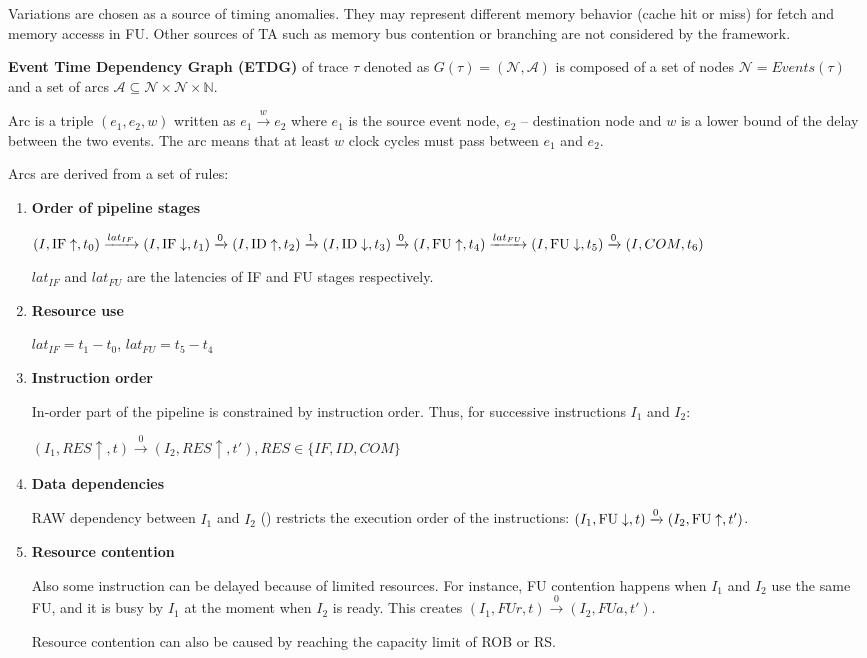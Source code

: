 Variations are chosen as a source of timing anomalies. They may represent different memory behavior (cache hit or miss) for fetch and memory accesss in FU. Other sources of TA such as memory bus contention or branching are not considered by the framework.

\textbf{Event Time Dependency Graph (ETDG)} of trace $\tau$ denoted as $G(\tau) = (\mathcal{N}, \mathcal{A})$ is composed of a set of nodes $\mathcal{N} = Events(\tau)$ and a set of arcs $\mathcal{A} \subseteq \mathcal{N} \times \mathcal{N} \times \mathbb{N}$. 


Arc is a triple $(e_1, e_2, w)$ written as $e_1 \xrightarrow{w} e_2$ where $e_1$ is the source event node, $e_2$ -- destination node and $w$ is a lower bound of the delay between the two events. The arc means that at least $w$ clock cycles must pass between $e_1$ and $e_2$. 

Arcs are derived from a set of rules:
\begin{enumerate}
    \item \textbf{Order of pipeline stages}
    
    $(I, \mathrm{IF}\uparrow, t_0) \xrightarrow{lat_{IF}} (I, \mathrm{IF}\downarrow, t_1) \xrightarrow{0} (I, \mathrm{ID}\uparrow, t_2) \xrightarrow{1} (I, \mathrm{ID}\downarrow, t_3) \xrightarrow{0} (I, \mathrm{FU}\uparrow, t_4)  \xrightarrow{lat_{FU}} (I, \mathrm{FU}\downarrow, t_5)  \xrightarrow{0} (I, COM, t_6)$

    $lat_{IF}$ and $lat_{FU}$ are the latencies of IF and FU stages respectively.

    \item \textbf{Resource use}
    
    $lat_{IF} = t_1 - t_0$, $lat_{FU} = t_5 - t_4$

    \item \textbf{Instruction order}
    
    In-order part of the pipeline is constrained by instruction order. Thus, for successive instructions $I_1$ and $I_2$:

    $(I_1, RES\uparrow, t) \xrightarrow{0} (I_2, RES\uparrow, t'), RES \in \{IF, ID, COM\}$


    \item \textbf{Data dependencies}
    
    RAW dependency between $I_1$ and $I_2$ () restricts the execution order of the instructions:  $(I_1, \mathrm{FU}\downarrow, t) \xrightarrow{0} (I_2, \mathrm{FU}\uparrow, t')$.
    
    \item \textbf{Resource contention}
    
    Also some instruction can be delayed because of limited resources. For instance, FU contention happens when $I_1$ and $I_2$ use the same FU, and it is busy by $I_1$ at the moment when $I_2$ is ready. This creates $(I_1, FUr, t) \xrightarrow{0} (I_2, FUa, t')$. 

    Resource contention can also be caused by reaching the capacity limit of ROB or RS. 
\end{enumerate}

